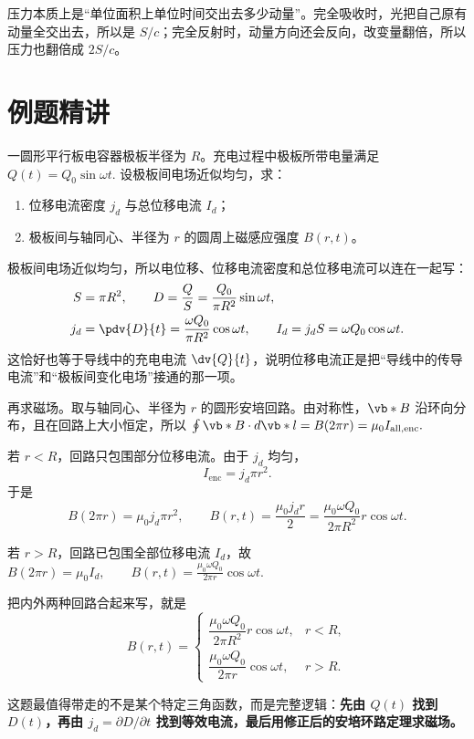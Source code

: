 \documentclass[lang=cn,11pt]{elegantbook}
\begin{document}
\begin{note}
 压力本质上是“单位面积上单位时间交出去多少动量”。完全吸收时，光把自己原有动量全交出去，所以是 \(S/c\)；完全反射时，动量方向还会反向，改变量翻倍，所以压力也翻倍成 \(2S/c\)。
\end{note}

\section{例题精讲}

\begin{exercise}[充电平行板电容器中的位移电流与环向磁场]
一圆形平行板电容器极板半径为 \(R\)。充电过程中极板所带电量满足
 \(Q(t)=Q_0\sin\omega t.\) 
设极板间电场近似均匀，求：
\begin{enumerate}
 \item 位移电流密度 \(j_d\) 与总位移电流 \(I_d\)；
 \item 极板间与轴同心、半径为 \(r\) 的圆周上磁感应强度 \(B(r,t)\)。
\end{enumerate}
\end{exercise}

\begin{solution}
极板间电场近似均匀，所以电位移、位移电流密度和总位移电流可以连在一起写：
\[
\begin{aligned}
S&=\pi R^2,\qquad
D=\frac{Q}{S}
=\frac{Q_0}{\pi R^2}\sin\omega t,\\
j_d&=\pdv{D}{t}
=\frac{\omega Q_0}{\pi R^2}\cos\omega t,\qquad
I_d=j_dS=\omega Q_0\cos\omega t.
\end{aligned}
\]
这恰好也等于导线中的充电电流 \(\dv{Q}{t}\)，说明位移电流正是把“导线中的传导电流”和“极板间变化电场”接通的那一项。

再求磁场。取与轴同心、半径为 \(r\) 的圆形安培回路。由对称性，\(\vb*{B}\) 沿环向分布，且在回路上大小恒定，所以
 \(\oint \vb*{B}\cdot d\vb*{l}=B(2\pi r)=\mu_0 I_{\mathrm{all,enc}}.\) 

若 \(r<R\)，回路只包围部分位移电流。由于 \(j_d\) 均匀，
\[
I_{\mathrm{enc}}=j_d\pi r^2.
\]
于是
\[
B(2\pi r)=\mu_0j_d\pi r^2,
\qquad
B(r,t)=\frac{\mu_0j_dr}{2}
=\frac{\mu_0\omega Q_0}{2\pi R^2}r\cos\omega t.
\]

若 \(r>R\)，回路已包围全部位移电流 \(I_d\)，故
 \(B(2\pi r)=\mu_0I_d, \qquad B(r,t)=\frac{\mu_0\omega Q_0}{2\pi r}\cos\omega t.\) 

把内外两种回路合起来写，就是
\[
B(r,t)=
\begin{cases}
\dfrac{\mu_0\omega Q_0}{2\pi R^2}r\cos\omega t, & r<R,\\[8pt]
\dfrac{\mu_0\omega Q_0}{2\pi r}\cos\omega t, & r>R.
\end{cases}
\]

这题最值得带走的不是某个特定三角函数，而是完整逻辑：\textbf{先由 \(Q(t)\) 找到 \(D(t)\)，再由 \(j_d=\partial D/\partial t\) 找到等效电流，最后用修正后的安培环路定理求磁场。}
\end{solution}
\end{document}
